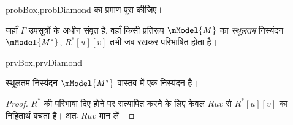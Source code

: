 \documentclass[../../../include/open-logic-section]{subfiles}
\begin{document}
\begin{probtag}{probBox,probDiamond}
   का प्रमाण पूरा कीजिए।
\end{probtag}

\begin{defn}
  जहाँ $\Gamma$ उपसूत्रों के अधीन संवृत है, वहाँ किसी प्रतिरूप
  $\mModel{M}$ का \emph{स्थूलतम} निस्यंदन~$\mModel{M^*}$,
  $R^*[u][v]$ तभी जब
   रखकर परिभाषित होता है।
  \begin{tagenumerate}{prvBox,prvDiamond}
  \end{tagenumerate}
\end{defn}

\begin{prop}
  स्थूलतम निस्यंदन $\mModel{M^*}$ वास्तव में एक निस्यंदन है।
\end{prop}

\begin{proof}
  $R^*$ की परिभाषा दिए होने पर सत्यापित करने के लिए केवल $Ruv$ से
  $R^*[u][v]$ का निहितार्थ बचता है। अतः $Ruv$ मान लें।
\end{proof}
\end{document}
